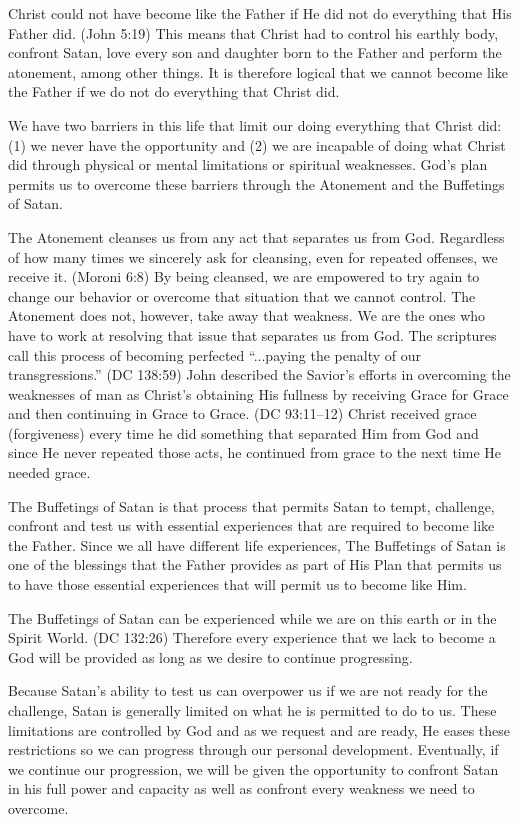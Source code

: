 		Christ could not have become like the Father if He did not do everything that His Father did. (John 5:19) This means that Christ had to control his earthly body, confront Satan, love every son and daughter born to the Father and perform the atonement, among other things. It is therefore logical that we cannot become like the Father if we do not do everything that Christ did.

		We have two barriers in this life that limit our doing everything that Christ did: (1) we never have the opportunity and (2) we are incapable of doing what Christ did through physical or mental limitations or spiritual weaknesses. God's plan permits us to overcome these barriers through the Atonement and the Buffetings of Satan. 

		The Atonement cleanses us from any act that separates us from God. Regardless of how many times we sincerely ask for cleansing, even for repeated offenses, we receive it. (Moroni 6:8) By being cleansed, we are empowered to try again to change our behavior or overcome that situation that we cannot control. The Atonement does not, however, take away that weakness. We are the ones who have to work at resolving that issue that separates us from God. The scriptures call this process of becoming perfected ``...paying the penalty of our transgressions.'' (DC 138:59) John described the Savior's efforts in overcoming the weaknesses of man as Christ's obtaining His fullness by receiving Grace for Grace and then continuing in Grace to Grace. (DC 93:11--12) Christ received grace (forgiveness) every time he did something that separated Him from God and since He never repeated those acts, he continued from grace to the next time He needed grace.

		The Buffetings of Satan is that process that permits Satan to tempt, challenge, confront and test us with essential experiences that are required to become like the Father. Since we all have different life experiences, The Buffetings of Satan is one of the blessings that the Father provides as part of His Plan that permits us to have those essential experiences that will permit us to become like Him. 

		The Buffetings of Satan can be experienced while we are on this earth or in the Spirit World. (DC 132:26) Therefore every experience that we lack to become a God will be provided as long as we desire to continue progressing.

		Because Satan's ability to test us can overpower us if we are not ready for the challenge, Satan is generally limited on what he is permitted to do to us. These limitations are controlled by God and as we request and are ready, He eases these restrictions so we can progress through our personal development. Eventually, if we continue our progression, we will be given the opportunity to confront Satan in his full power and capacity as well as confront every weakness we need to overcome.